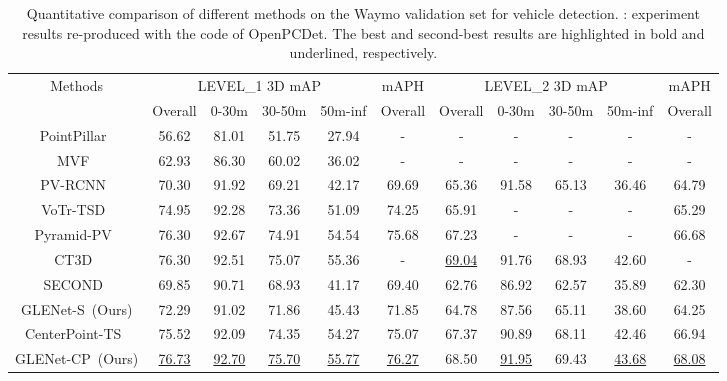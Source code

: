 \documentclass[twocolumn]{svjour3}
\begin{document}
\setlength{\tabcolsep}{6pt}
\begin{table*}[hbp]
        \begin{threeparttable}
	\centering
	\caption{Quantitative comparison of different methods on the Waymo validation set for vehicle detection. : experiment results re-produced with the code of OpenPCDet. The best and second-best results are highlighted in bold and underlined, respectively.}
\label{table:waymo_val}
\begin{tabular}{c|ccccc|ccccc}
			\toprule
			\multirow{2}{*}{Methods} & \multicolumn{4}{c}{LEVEL\_1 3D mAP} & mAPH    & \multicolumn{4}{c}{LEVEL\_2 3D mAP} & mAPH     \\
			& Overall & 0-30m & 30-50m & 50m-inf  & Overall & Overall & 0-30m & 30-50m & 50m-inf  & Overall  \\ 
			\hline
			PointPillar~\citep{Lang_2019_CVPR}    & 56.62   & 81.01 & 51.75  & 27.94    & -       & -   & - & -  & -    & -        \\
			MVF~\citep{zhou2020end}    & 62.93   & 86.30 & 60.02  & 36.02    & -       & -       & -     & -      & -        & -        \\
			PV-RCNN~\citep{shi2020pv}  & 70.30   & 91.92 & 69.21  & 42.17    & 69.69   & 65.36   & 91.58 & 65.13  & 36.46    & 64.79    \\
			VoTr-TSD~\citep{mao2021voxel}  & 74.95   & 92.28 & 73.36  & 51.09    & 74.25   & 65.91   & -     & -      & -        & 65.29    \\
			Pyramid-PV~\citep{Mao_2021_ICCV}  & 76.30   & 92.67 & 74.91  & 54.54    & 75.68   & 67.23   & -     & -      & -        & 66.68    \\
			CT3D~\citep{sheng2021improving}   & 76.30   & 92.51 & 75.07  & 55.36    & -       & \underline{69.04}   & 91.76 & 68.93  & 42.60    & -        \\ 
			\hline
			SECOND~\citep{yan2018second}      & 69.85   & 90.71 & 68.93  & 41.17    & 69.40   & 62.76   & 86.92 & 62.57  & 35.89    & 62.30    \\
			GLENet-S~(Ours)          & 72.29   & 91.02 & 71.86  & 45.43    & 71.85   & 64.78   & 87.56 & 65.11  & 38.60    & 64.25    \\ 
			\hline
			CenterPoint-TS~\citep{yin2021center} & 75.52  & 92.09  & 74.35  & 54.27  & 75.07    & 67.37  & 90.89  & 68.11  & 42.46  & 66.94   \\
			GLENet-CP~(Ours)                       & \underline{76.73}  & \underline{92.70}  & \underline{75.70}  & \underline{55.77}  & \underline{76.27}    & 68.50  & \underline{91.95}  & 69.43  & \underline{43.68}  & \underline{68.08}   \\ 

\end{tabular}
\end{threeparttable}
\end{table*}
\end{document}
